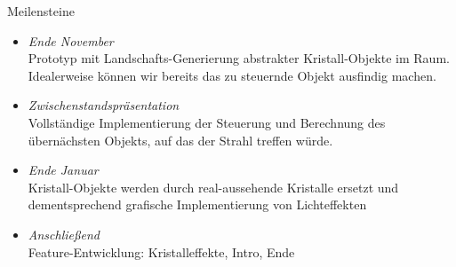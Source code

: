 \begin{frame}{Meilensteine}
	\begin{itemize}
		\item \emph{Ende November}\\
		Prototyp mit Landschafts-Generierung abstrakter \glqq Kristall\grqq -Objekte im Raum. Idealerweise können wir bereits das zu steuernde Objekt ausfindig machen.
		\item \emph{Zwischenstandspräsentation}\\
		Vollständige Implementierung der Steuerung und Berechnung des übernächsten Objekts, auf das der Strahl treffen würde.
		\item \emph{Ende Januar}\\
		Kristall-Objekte werden durch real-aussehende Kristalle ersetzt und dementsprechend grafische Implementierung von Lichteffekten
		\item \emph{Anschließend}\\
		Feature-Entwicklung: Kristalleffekte, Intro, Ende
	\end{itemize}
\end{frame}

%

